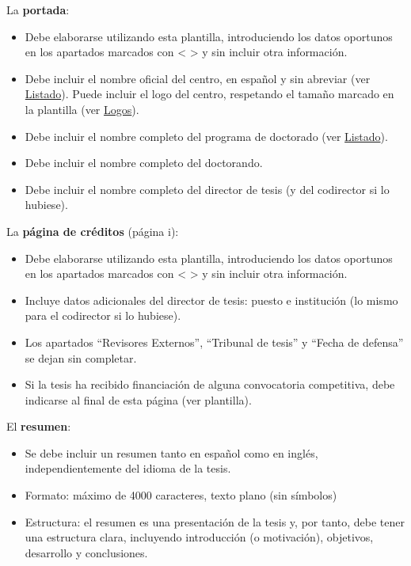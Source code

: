 La \textbf{portada}:
\begin{itemize}
    \item Debe elaborarse utilizando esta plantilla, introduciendo los datos oportunos en los apartados marcados con < > y sin incluir otra información.
    \item Debe incluir el nombre oficial del centro, en español y sin abreviar (ver \href{https://www.upm.es/sfs/Rectorado/Vicerrectorado%20de%20Investigacion/Doctorado/Tesis/impresos/5_Listado%20de%20PD%20y%20sus%20centros.pdf}{Listado}). Puede incluir el logo del centro, respetando el tamaño marcado en la plantilla (ver \href{https://www.upm.es/UPM/SalaPrensa/IdentidadGrafica/LogosPlantillas}{Logos}).
    \item Debe incluir el nombre completo del programa de doctorado (ver \href{https://www.upm.es/sfs/Rectorado/Vicerrectorado%20de%20Investigacion/Doctorado/Tesis/impresos/5_Listado%20de%20PD%20y%20sus%20centros.pdf}{Listado}).
    \item Debe incluir el nombre completo del doctorando.
    \item Debe incluir el nombre completo del director de tesis (y del codirector si lo hubiese).
\end{itemize}

La \textbf{página de créditos} (página i):
\begin{itemize}
    \item Debe elaborarse utilizando esta plantilla, introduciendo los datos oportunos en los apartados marcados con < > y sin incluir otra información.
    \item Incluye datos adicionales del director de tesis: puesto e institución (lo mismo para el codirector si lo hubiese).
    \item Los apartados “Revisores Externos”, “Tribunal de tesis” y “Fecha de defensa” se dejan sin completar.
    \item Si la tesis ha recibido financiación de alguna convocatoria competitiva, debe indicarse al final de esta página (ver plantilla).
\end{itemize}

El \textbf{resumen}:
\begin{itemize}
    \item Se debe incluir un resumen tanto en español como en inglés, independientemente del idioma de la tesis.
    \item Formato: máximo de 4000 caracteres, texto plano (sin símbolos)
    \item Estructura: el resumen es una presentación de la tesis y, por tanto, debe tener una estructura clara, incluyendo introducción (o motivación), objetivos, desarrollo y conclusiones.
\end{itemize}

